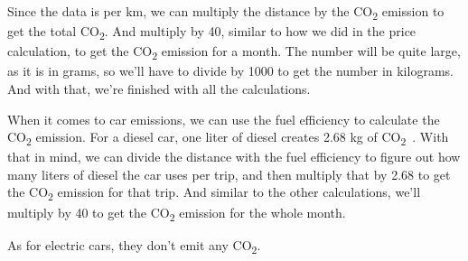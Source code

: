 Since the data is per km, we can multiply the distance by the \unit{CO_{2}} emission to get the total \unit{CO_{2}}.
And multiply by 40, similar to how we did in the price calculation, to get the \unit{CO_{2}} emission for a month.
The number will be quite large, as it is in grams, so we'll have to divide by 1000 to get the number in kilograms.
And with that, we're finished with all the calculations.

When it comes to car emissions, we can use the fuel efficiency to calculate the \unit{CO_{2}} emission.
For a diesel car, one liter of diesel creates 2.68 kg of \unit{CO_{2}}~\cite{co2_car}.
With that in mind, we can divide the distance with the fuel efficiency to figure out how many liters of
diesel the car uses per trip, and then multiply that by 2.68 to get the \unit{CO_{2}} emission for that trip.
And similar to the other calculations, we'll multiply by 40 to get the \unit{CO_{2}} emission for the whole month.

As for electric cars, they don't emit any \unit{CO_{2}}.



